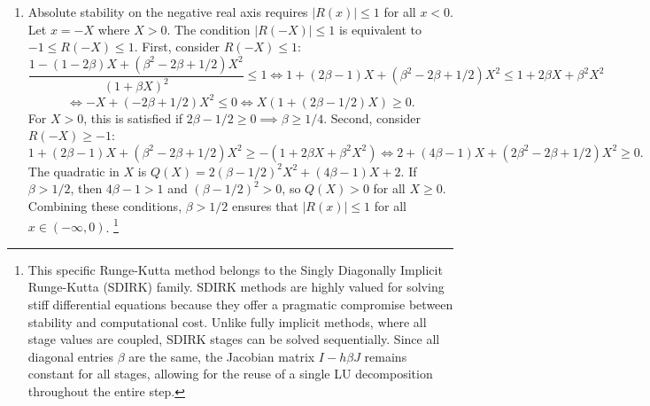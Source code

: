 \begin{solution}
\begin{enumerate}
\item[(b)] Absolute stability on the negative real axis requires $|R(x)| \leq 1$ for all $x < 0$. Let $x = -X$ where $X > 0$. The condition $|R(-X)| \leq 1$ is equivalent to $-1 \leq R(-X) \leq 1$.
First, consider $R(-X) \leq 1$:
\[
\frac{1 - (1-2\beta)X + (\beta^2 - 2\beta + 1/2) X^2}{(1 + \beta X)^2} \leq 1 \iff 1 + (2\beta-1)X + (\beta^2-2\beta+1/2)X^2 \leq 1 + 2\beta X + \beta^2 X^2
\]
\[
\iff -X + (-2\beta + 1/2) X^2 \leq 0 \iff X(1 + (2\beta - 1/2)X) \geq 0.
\]
For $X > 0$, this is satisfied if $2\beta - 1/2 \geq 0 \implies \beta \geq 1/4$.
Second, consider $R(-X) \geq -1$:
\[
1 + (2\beta-1)X + (\beta^2-2\beta+1/2)X^2 \geq -(1 + 2\beta X + \beta^2 X^2) \iff 2 + (4\beta-1)X + (2\beta^2 - 2\beta + 1/2) X^2 \geq 0.
\]
The quadratic in $X$ is $Q(X) = 2(\beta-1/2)^2 X^2 + (4\beta-1)X + 2$. If $\beta > 1/2$, then $4\beta-1 > 1$ and $(\beta-1/2)^2 > 0$, so $Q(X) > 0$ for all $X \geq 0$.
Combining these conditions, $\beta > 1/2$ ensures that $|R(x)| \leq 1$ for all $x \in (-\infty, 0)$. \footnote{This specific Runge-Kutta method belongs to the Singly Diagonally Implicit Runge-Kutta (SDIRK) family. SDIRK methods are highly valued for solving stiff differential equations because they offer a pragmatic compromise between stability and computational cost. Unlike fully implicit methods, where all stage values are coupled, SDIRK stages can be solved sequentially. Since all diagonal entries $\beta$ are the same, the Jacobian matrix $I - h\beta J$ remains constant for all stages, allowing for the reuse of a single LU decomposition throughout the entire step.}
\end{enumerate}
\end{solution}

